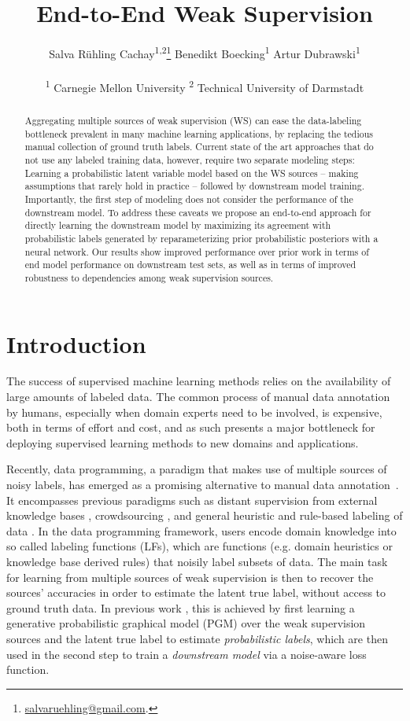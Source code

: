\documentclass{article}
\title{End-to-End Weak Supervision}
\author{Salva Rühling Cachay\textsuperscript{1,2}\thanks{\href{mailto:salvaruehling@gmail.com}{salvaruehling@gmail.com}.}
  \enskip\enskip\enskip\enskip\enskip\enskip\enskip
   Benedikt Boecking\textsuperscript{1}
  \enskip\enskip\enskip\enskip\enskip\enskip\enskip
   Artur Dubrawski\textsuperscript{1}\\
   \\
   \textsuperscript{1} Carnegie Mellon University 
  \enskip\enskip\enskip\enskip\enskip 
   \textsuperscript{2} Technical University of Darmstadt\\
}
\begin{document}
\maketitle

\begin{abstract}
Aggregating multiple sources of weak supervision (WS) can ease the data-labeling bottleneck prevalent in many machine learning applications, by replacing the tedious manual collection of ground truth labels. 
Current state of the art approaches that do not use any labeled training data, however, require two separate modeling steps: Learning a probabilistic latent variable model based on the WS sources -- making assumptions that rarely hold in practice -- followed by downstream model training. 
Importantly, the first step of modeling does not consider the performance of the downstream model.
To address these caveats we propose an end-to-end approach for directly learning the downstream model by maximizing its agreement with probabilistic labels generated by reparameterizing prior probabilistic posteriors with a neural network. 
Our results show improved performance over prior work in terms of end model performance on downstream test sets, as well as in terms of improved robustness to dependencies among weak supervision sources.
 \end{abstract}

\section{Introduction}
\label{introduction}
The success of supervised machine learning methods relies on the availability of large amounts of labeled data. The common process of manual data annotation by humans, especially when domain experts need to be involved, is expensive, both in terms of effort and cost, and as such presents a major bottleneck for deploying supervised learning methods to new domains and applications. 

Recently, data programming, a paradigm that makes use of multiple sources of noisy labels, has emerged as a promising alternative to manual data annotation~\cite{DP}.
It encompasses previous paradigms such as distant supervision from external knowledge bases \cite{distantSupervision2, distantSupervision1}, crowdsourcing \cite{SkeneModel, Crowdsourcing1, Crowdsourcing3, Crowdsourcing2}, and general heuristic and rule-based labeling of data \cite{patternbasedWS, rulebasedWSforChemistry}.
In the data programming framework, users encode domain knowledge into so called labeling functions (LFs), which are functions (e.g. domain heuristics or knowledge base derived rules) that noisily label subsets of data.
The main task for learning from multiple sources of weak supervision is then to recover the sources' accuracies in order to estimate the latent true label, without access to ground truth data. In previous work \cite{DP, Multitask, triplets}, this is achieved by first learning a generative probabilistic graphical model (PGM) over the weak supervision sources and the latent true label to estimate \emph{probabilistic labels}, which are then used in the second step to train a \emph{downstream model} via a noise-aware loss function.
\end{document}
